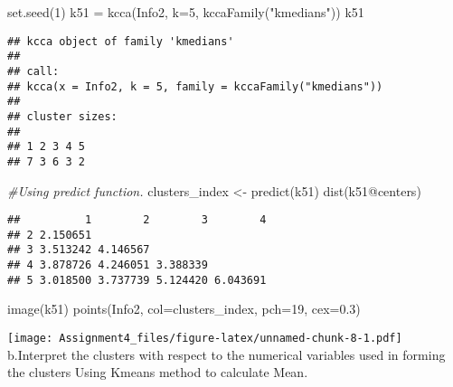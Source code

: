 \documentclass[
]{article}
\newenvironment{Shaded}{\begin{snugshade}}{\end{snugshade}}
\newcommand{\AttributeTok}[1]{\textcolor[rgb]{0.77,0.63,0.00}{#1}}
\newcommand{\CommentTok}[1]{\textcolor[rgb]{0.56,0.35,0.01}{\textit{#1}}}
\newcommand{\DecValTok}[1]{\textcolor[rgb]{0.00,0.00,0.81}{#1}}
\newcommand{\FloatTok}[1]{\textcolor[rgb]{0.00,0.00,0.81}{#1}}
\newcommand{\FunctionTok}[1]{\textcolor[rgb]{0.00,0.00,0.00}{#1}}
\newcommand{\NormalTok}[1]{#1}
\newcommand{\OtherTok}[1]{\textcolor[rgb]{0.56,0.35,0.01}{#1}}
\newcommand{\SpecialCharTok}[1]{\textcolor[rgb]{0.00,0.00,0.00}{#1}}
\newcommand{\StringTok}[1]{\textcolor[rgb]{0.31,0.60,0.02}{#1}}
\begin{document}
\begin{Shaded}
\begin{Highlighting}[]
\FunctionTok{set.seed}\NormalTok{(}\DecValTok{1}\NormalTok{)}
\NormalTok{k51 }\OtherTok{=} \FunctionTok{kcca}\NormalTok{(Info2, }\AttributeTok{k=}\DecValTok{5}\NormalTok{, }\FunctionTok{kccaFamily}\NormalTok{(}\StringTok{"kmedians"}\NormalTok{))}
\NormalTok{k51}
\end{Highlighting}
\end{Shaded}

\begin{verbatim}
## kcca object of family 'kmedians' 
## 
## call:
## kcca(x = Info2, k = 5, family = kccaFamily("kmedians"))
## 
## cluster sizes:
## 
## 1 2 3 4 5 
## 7 3 6 3 2
\end{verbatim}

\begin{Shaded}
\begin{Highlighting}[]
\CommentTok{\#Using predict function.}
\NormalTok{clusters\_index }\OtherTok{\textless{}{-}} \FunctionTok{predict}\NormalTok{(k51)}
\FunctionTok{dist}\NormalTok{(k51}\SpecialCharTok{@}\NormalTok{centers)}
\end{Highlighting}
\end{Shaded}

\begin{verbatim}
##          1        2        3        4
## 2 2.150651                           
## 3 3.513242 4.146567                  
## 4 3.878726 4.246051 3.388339         
## 5 3.018500 3.737739 5.124420 6.043691
\end{verbatim}

\begin{Shaded}
\begin{Highlighting}[]
\FunctionTok{image}\NormalTok{(k51)}
\FunctionTok{points}\NormalTok{(Info2, }\AttributeTok{col=}\NormalTok{clusters\_index, }\AttributeTok{pch=}\DecValTok{19}\NormalTok{, }\AttributeTok{cex=}\FloatTok{0.3}\NormalTok{)}
\end{Highlighting}
\end{Shaded}

\texttt{[image: Assignment4\_files/figure-latex/unnamed-chunk-8-1.pdf]}
b.Interpret the clusters with respect to the numerical variables used in
forming the clusters Using Kmeans method to calculate Mean.

\begin{Shaded}
\end{Shaded}
\end{document}
